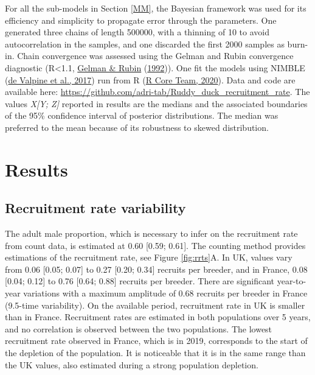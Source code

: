 \documentclass[
  english,
]{article}
\begin{document}
For all the sub-models in Section \ref{MM}, the Bayesian framework was used for its efficiency and simplicity to propagate error through the parameters. One generated three chains of length 500000, with a thinning of 10 to avoid autocorrelation in the samples, and one discarded the first 2000 samples as burn-in. Chain convergence was assessed using the Gelman and Rubin convergence diagnostic (R\textless1.1, \protect\hyperlink{ref-Gelman1992}{Gelman \& Rubin} (\protect\hyperlink{ref-Gelman1992}{1992})). One fit the models using NIMBLE (\protect\hyperlink{ref-Valpine2017}{de Valpine et al., 2017}) run from R (\protect\hyperlink{ref-RCT2020}{R Core Team, 2020}). Data and code are available here: \url{https://github.com/adri-tab/Ruddy_duck_recruitment_rate}. The values \emph{X{[}Y; Z{]}} reported in results are the medians and the associated boundaries of the 95\% confidence interval of posterior distributions. The median was preferred to the mean because of its robustness to skewed distribution.

\hypertarget{results}{%
\section{Results}\label{results}}

\hypertarget{recruitment-rate-variability}{%
\subsection{Recruitment rate variability}\label{recruitment-rate-variability}}

The adult male proportion, which is necessary to infer on the recruitment rate from count data, is estimated at 0.60 {[}0.59; 0.61{]}. The counting method provides estimations of the recruitment rate, see Figure \ref{fig:rrts}A. In UK, values vary from 0.06 {[}0.05; 0.07{]} to 0.27 {[}0.20; 0.34{]} recruits per breeder, and in France, 0.08 {[}0.04; 0.12{]} to 0.76 {[}0.64; 0.88{]} recruits per breeder. There are significant year-to-year variations with a maximum amplitude of 0.68 recruits per breeder in France (9.5-time variability). On the available period, recruitment rate in UK is smaller than in France. Recruitment rates are estimated in both populations over 5 years, and no correlation is observed between the two populations. The lowest recruitment rate observed in France, which is in 2019, corresponds to the start of the depletion of the population. It is noticeable that it is in the same range than the UK values, also estimated during a strong population depletion.
\end{document}
